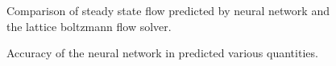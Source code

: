 \documentclass{article} %
\begin{document}
\begin{figure}[!t]
\begin{center}
\end{center}
\caption{Comparison of steady state flow predicted by neural network and the lattice boltzmann flow solver.}
\label{flow_accuracy}
\end{figure}

\begin{figure}[h]
\begin{center}
\end{center}
\caption{Accuracy of the neural network in predicted various quantities.}
\end{figure}
\end{document}
